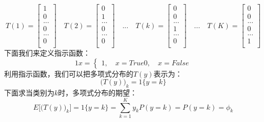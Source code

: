 \documentclass[UTF8]{article}
\begin{document}
\begin{equation}
T(1) = \begin{bmatrix}
1 \\
0 \\
... \\
0 \\
... \\
0 \\
\end{bmatrix} \quad T(2) = \begin{bmatrix}
0 \\
1 \\
... \\
0 \\
... \\
0 \\
\end{bmatrix} \quad ... \quad T(k) = \begin{bmatrix}
0 \\
0 \\
... \\
1 \\
... \\
0 \\
\end{bmatrix} \quad ... \quad T(K) = \begin{bmatrix}
0 \\
0 \\
... \\
0 \\
... \\
1 \\
\end{bmatrix}
\label{lcrn-multi-class-phi-ty-definition}
\end{equation}
下面我们来定义指示函数：
\begin{equation}
1{x}=\begin{cases}
1, \quad x=True
0, \quad x=False
\end{cases}
\label{lcrn-multi-class-indicator-function}
\end{equation}
利用指示函数，我们可以把多项式分布的$T(y)$表示为：
\begin{equation}
\Big( T(y) \Big)_{k} = 1\{y=k\}
\label{lcrn-multi-class-indicator-function-ty}
\end{equation}
下面求当类别为$k$时，多项式分布的期望：
\begin{equation}
E\bigg[ \Big( T(y) \Big)_{k} \bigg] = 1\{y=k\} = \sum_{k=1}^{K} y_{k} P(y=k) = P(y=k) = \phi _{k}
\label{lcrn-multi-class-indicator-function-ty-Ex}
\end{equation}
\end{document}

